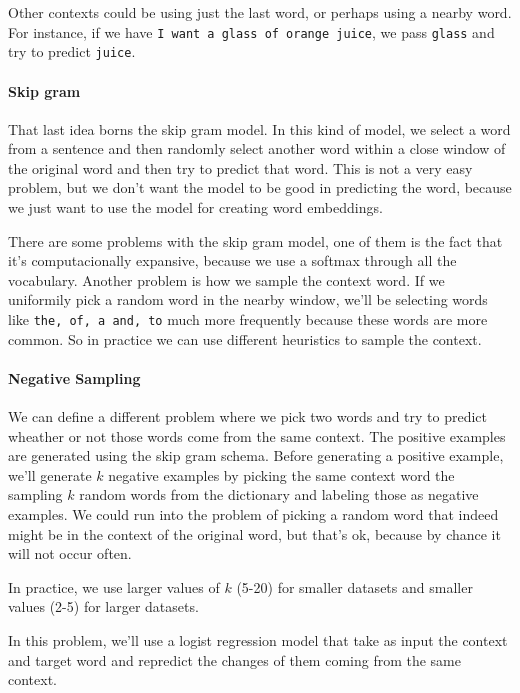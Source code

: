 \documentclass[12pt, a4paper, oneside]{book}
\begin{document}
Other contexts could be using just the last word, or perhaps using a nearby
word. For instance, if we have \texttt{I want a glass of orange juice}, we pass
\texttt{glass} and try to predict \texttt{juice}.

\paragraph{Skip gram}%
\label{par:skip_gram}

That last idea borns the skip gram model. In this kind of model, we select a
word from a sentence and then randomly select another word within a close window
of the original word and then try to predict that word. This is not a very easy
problem, but we don't want the model to be good in predicting the word, because
we just want to use the model for creating word embeddings.

There are some problems with the skip gram model, one of them is the fact that
it's computacionally expansive, because we use a softmax through all the
vocabulary. Another problem is how we sample the context word. If we uniformily
pick a random word in the nearby window, we'll be selecting words like
\texttt{the, of, a and, to} much more frequently because these words are more
common. So in practice we can use different heuristics to sample the context.

\paragraph{Negative Sampling}%
\label{par:negative_sampling}

We can define a different problem where we pick two words and try to predict
wheather or not those words come from the same context. The positive examples
are generated using the skip gram schema. Before generating a positive example,
we'll generate $k$ negative examples by picking the same context word the
sampling $k$ random words from the dictionary and labeling those as negative
examples. We could run into the problem of picking a random word that indeed
might be in the context of the original word, but that's ok, because by chance
it will not occur often.

In practice, we use larger values of $k$ (5-20) for smaller datasets and
smaller values (2-5) for larger datasets.

In this problem, we'll use a logist regression model that take as input the
context and target word and repredict the changes of them coming from the same
context.
\end{document}
